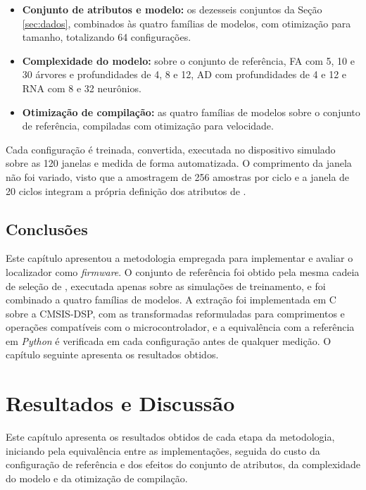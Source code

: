 \documentclass[
	12pt,				%
	openright,			%
	oneside,			%
	a4paper,			%
	english,			%
	brazil,				%
	]{abntex2}
\begin{document}
\begin{itemize}
    \item \textbf{Conjunto de atributos e modelo:} os dezesseis conjuntos da Seção \ref{sec:dados}, combinados às quatro famílias de modelos, com otimização para tamanho, totalizando 64 configurações.

    \item \textbf{Complexidade do modelo:} sobre o conjunto de referência, FA com 5, 10 e 30 árvores e profundidades de 4, 8 e 12, AD com profundidades de 4 e 12 e RNA com 8 e 32 neurônios.

    \item \textbf{Otimização de compilação:} as quatro famílias de modelos sobre o conjunto de referência, compiladas com otimização para velocidade.
\end{itemize}

Cada configuração é treinada, convertida, executada no dispositivo simulado sobre as 120 janelas e medida de forma automatizada. O comprimento da janela não foi variado, visto que a amostragem de 256 amostras por ciclo e a janela de 20 ciclos integram a própria definição dos atributos de .

\section{Conclusões}
Este capítulo apresentou a metodologia empregada para implementar e avaliar o localizador como \textit{firmware}. O conjunto de referência foi obtido pela mesma cadeia de seleção de , executada apenas sobre as simulações de treinamento, e foi combinado a quatro famílias de modelos. A extração foi implementada em C sobre a CMSIS-DSP, com as transformadas reformuladas para comprimentos e operações compatíveis com o microcontrolador, e a equivalência com a referência em \textit{Python} é verificada em cada configuração antes de qualquer medição. O capítulo seguinte apresenta os resultados obtidos.

\chapter{Resultados e Discussão}
Este capítulo apresenta os resultados obtidos de cada etapa da metodologia, iniciando pela equivalência entre as implementações, seguida do custo da configuração de referência e dos efeitos do conjunto de atributos, da complexidade do modelo e da otimização de compilação.
\end{document}
